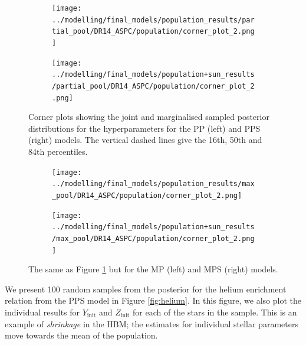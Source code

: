 \documentclass[a4paper,fleqn,usenatbib]{mnras}
\begin{document}
\begin{figure}
    \begin{subfigure}[b]{.5\linewidth}
        \centering
        \texttt{[image: ../modelling/final\_models/population\_results/partial\_pool/DR14\_ASPC/population/corner\_plot\_2.png]}
    \end{subfigure}%
    \begin{subfigure}[b]{.5\linewidth}
        \centering
        \texttt{[image: ../modelling/final\_models/population+sun\_results/partial\_pool/DR14\_ASPC/population/corner\_plot\_2.png]}
    \end{subfigure}
    \caption{Corner plots showing the joint and marginalised sampled posterior distributions for the hyperparameters for the PP (left) and PPS (right) models. The vertical dashed lines give the 16th, 50th and 84th percentiles.}
    \label{fig:corners-pp}
\end{figure} 

\begin{figure}
    \begin{subfigure}[b]{.5\linewidth}
        \centering
        \texttt{[image: ../modelling/final\_models/population\_results/max\_pool/DR14\_ASPC/population/corner\_plot\_2.png]}
    \end{subfigure}%
    \begin{subfigure}[b]{.5\linewidth}
        \centering
        \texttt{[image: ../modelling/final\_models/population+sun\_results/max\_pool/DR14\_ASPC/population/corner\_plot\_2.png]}
    \end{subfigure}
    \caption{The same as Figure \ref{fig:corners-pp} but for the MP (left) and MPS (right) models.}
    \label{fig:corners-mp}
\end{figure} 

We present 100 random samples from the posterior for the helium enrichment relation from the PPS model in Figure \ref{fig:helium}. In this figure, we also plot the individual results for $Y_\mathrm{init}$ and $Z_\mathrm{init}$ for each of the stars in the sample. This is an example of \emph{shrinkage} in the HBM; the estimates for individual stellar parameters move towards the mean of the population.
\end{document}

